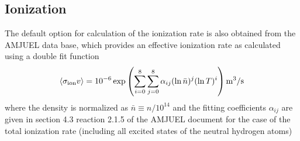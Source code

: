 \documentclass[amsmath,amssymb,a4]{revtex4-2}
\begin{document}
\subsection{Ionization}
The default option for calculation of the ionization rate is also obtained from the AMJUEL data base, which provides an effective ionization rate as calculated using a double fit function
\begin{equation}\label{ionization_AMJUEL}
    \langle\sigma_{\rm ion} v\rangle = 10^{-6} \exp\left( \sum_{i=0}^8\sum_{j=0}^8 \alpha_{ij} (\ln \bar n)^j (\ln T)^i \right)  {\rm m}^3/{\rm s}
\end{equation}
where the density is normalized as $\bar n \equiv n / 10^{14}$ and the fitting coefficients $\alpha_{ij}$ are given in section 4.3 reaction 2.1.5 of the AMJUEL document for the case of the total ionization rate (including all excited states of the neutral hydrogen atoms)
\end{document}
